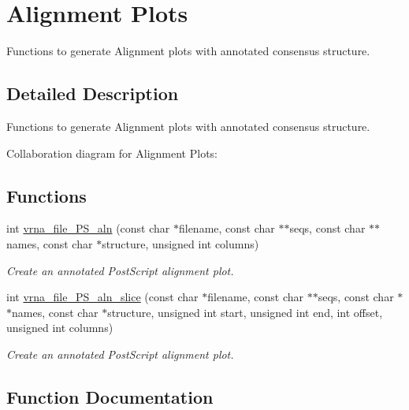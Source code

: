 \hypertarget{group__alignment__plots}{}\section{Alignment Plots}
\label{group__alignment__plots}


Functions to generate Alignment plots with annotated consensus structure.  




\subsection{Detailed Description}
Functions to generate Alignment plots with annotated consensus structure. 

Collaboration diagram for Alignment Plots\+:
\subsection*{Functions}
\begin{DoxyCompactItemize}
\item 
int \mbox{\hyperlink{group__alignment__plots_ga3bb7409f5b73c2273f9f76cf8b754034}{vrna\+\_\+file\+\_\+\+P\+S\+\_\+aln}} (const char $\ast$filename, const char $\ast$$\ast$seqs, const char $\ast$$\ast$names, const char $\ast$structure, unsigned int columns)
\begin{DoxyCompactList}\small\item\em Create an annotated Post\+Script alignment plot. \end{DoxyCompactList}\item 
int \mbox{\hyperlink{group__alignment__plots_ga2b132dddeb2044e52dc39cf0ad8afaee}{vrna\+\_\+file\+\_\+\+P\+S\+\_\+aln\+\_\+slice}} (const char $\ast$filename, const char $\ast$$\ast$seqs, const char $\ast$$\ast$names, const char $\ast$structure, unsigned int start, unsigned int end, int offset, unsigned int columns)
\begin{DoxyCompactList}\small\item\em Create an annotated Post\+Script alignment plot. \end{DoxyCompactList}\end{DoxyCompactItemize}


\subsection{Function Documentation}
\mbox{\label{group__alignment__plots_ga3bb7409f5b73c2273f9f76cf8b754034}} 

